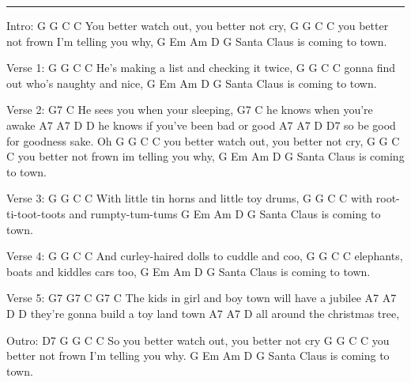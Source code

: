 \noindent\rule{\columnwidth}{1pt}

\begin{multicols}{2}
\begin{lstsong}
Intro:
   G            G         C         C
You better watch out, you better not cry,                             
   G           G         C           C
you better not frown I'm telling you why,
 G    Em       Am        D   G
Santa Claus is coming to town.

Verse 1:
       G       G            C        C
He's making a list and checking it twice,
G           G          C           C
gonna find out who's naughty and nice,
 G    Em       Am      D   G
Santa Claus is coming to town.

Verse 2:
    G7                  C
He sees you when your sleeping,
    G7              C
he knows when you're awake
     A7       A7         D      D
he knows if you've been bad or good
       A7         A7      D    D7
so be good for goodness sake. Oh
      G           G         C         C
you better watch out, you better not cry,
      G          G        C           C
you better not frown im telling you why,
 G    Em       Am      D   G
Santa Claus is coming to town.

Verse 3:
       G           G        C          C
With little tin horns and little toy drums,
       G            G         C          C
with root-ti-toot-toots and rumpty-tum-tums
  G     Em       Am       D    G
Santa Claus is coming to town.

Verse 4:
      G              G       C         C
And curley-haired dolls to cuddle and coo,
    G        G          C           C
elephants, boats and kiddles cars too,
G      Em       Am     D   G
Santa Claus is coming to town.

Verse 5:
    G7        G7      C        G7           C
The kids in girl and boy town will have a jubilee
          A7     A7    D         D
they're gonna build a toy land town
     A7           A7       D
all around the christmas tree,

Outro:
 D7      G           G          C        C
So you better watch out, you better not cry
      G          G          C          C
you better not frown I'm telling you why.
   G   Em       Am     D   G
Santa Claus is coming to town.  
\end{lstsong}
\end{multicols}
\newpage

